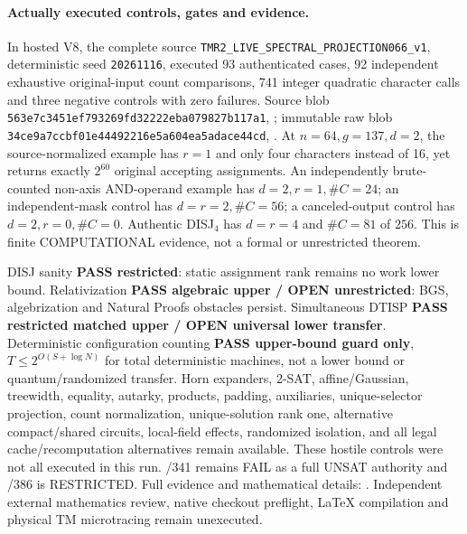 \documentclass[11pt]{article}
\begin{document}
\paragraph{Actually executed controls, gates and evidence.}
In hosted V8, the complete source
\texttt{TMR2\_LIVE\_SPECTRAL\_PROJECTION066\_v1},
deterministic seed \texttt{20261116}, executed 93
authenticated cases, 92 independent exhaustive
original-input count comparisons, 741 integer quadratic
character calls and three negative controls with zero
failures. Source blob
\texttt{563e7c3451ef793269fd32222eba079827b117a1},
;
immutable raw blob
\texttt{34ce9a7ccbf01e44492216e5a604ea5adace44cd},
.
At $n=64,g=137,d=2$, the source-normalized example
has $r=1$ and only four characters instead of 16, yet
returns exactly $2^{60}$ original accepting assignments.
An independently brute-counted non-axis AND-operand
example has $d=2,r=1,\#C=24$; an independent-mask control
has $d=r=2,\#C=56$; a canceled-output control has
$d=2,r=0,\#C=0$. Authentic DISJ$_4$ has
$d=r=4$ and $\#C=81$ of $256$. This is finite
COMPUTATIONAL evidence, not a formal or unrestricted theorem.

DISJ sanity \textbf{PASS restricted}: static assignment
rank remains no work lower bound. Relativization
\textbf{PASS algebraic upper / OPEN unrestricted}:
BGS, algebrization and Natural Proofs obstacles persist.
Simultaneous DTISP \textbf{PASS restricted matched upper /
OPEN universal lower transfer}. Deterministic configuration
counting \textbf{PASS upper-bound guard only},
$T\le2^{O(S+\log N)}$ for total deterministic machines,
not a lower bound or quantum/randomized transfer.
Horn expanders, 2-SAT, affine/Gaussian, treewidth,
equality, autarky, products, padding, auxiliaries,
unique-selector projection, count normalization,
unique-solution rank one, alternative compact/shared
circuits, local-field effects, randomized isolation,
and all legal cache/recomputation alternatives remain
available. These hostile controls were not all executed
in this run. /341 remains FAIL as a full UNSAT
authority and /386 is RESTRICTED.
Full evidence and mathematical details:
.
Independent external mathematics review, native checkout
preflight, LaTeX compilation and physical TM microtracing
remain unexecuted.
\end{document}
